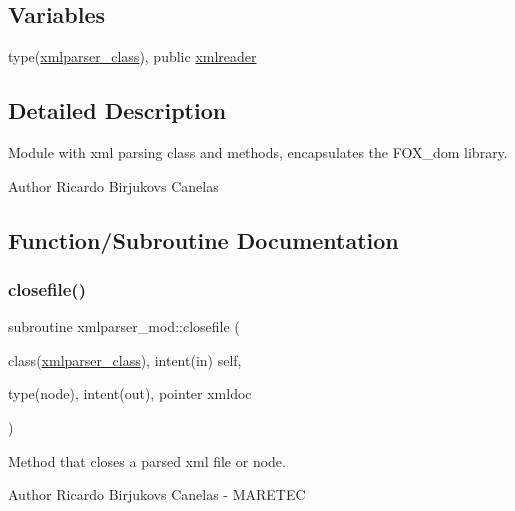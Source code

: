 \subsection*{Variables}
\begin{DoxyCompactItemize}
\item 
type(\mbox{\hyperlink{structxmlparser__mod_1_1xmlparser__class}{xmlparser\+\_\+class}}), public \mbox{\hyperlink{namespacexmlparser__mod_a482bd93d0a4ba8c9c2000713a4b14799}{xmlreader}}
\end{DoxyCompactItemize}


\subsection{Detailed Description}
Module with xml parsing class and methods, encapsulates the F\+O\+X\+\_\+dom library. 

\begin{DoxyAuthor}{Author}
Ricardo Birjukovs Canelas 
\end{DoxyAuthor}


\subsection{Function/\+Subroutine Documentation}
\mbox{\label{namespacexmlparser__mod_a9eed98475e0d55a3c7b2eeb88925a48c}} 
\subsubsection{\texorpdfstring{closefile()}{closefile()}}
{\footnotesize\ttfamily subroutine xmlparser\+\_\+mod\+::closefile (\begin{DoxyParamCaption}\item[{class(\mbox{\hyperlink{structxmlparser__mod_1_1xmlparser__class}{xmlparser\+\_\+class}}), intent(in)}]{self,  }\item[{type(node), intent(out), pointer}]{xmldoc }\end{DoxyParamCaption})\hspace{0.3cm}{\ttfamily [private]}}



Method that closes a parsed xml file or node. 

\begin{DoxyAuthor}{Author}
Ricardo Birjukovs Canelas -\/ M\+A\+R\+E\+T\+EC 
\end{DoxyAuthor}

